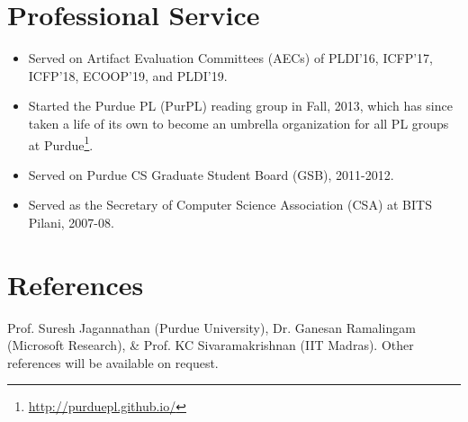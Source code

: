\documentclass[margin,line]{res}
\begin{document}
\begin{resume}
\section {Professional Service}
\begin{itemize}
  \item Served on Artifact Evaluation Committees (AECs) of PLDI'16,
    ICFP'17, ICFP'18, ECOOP'19, and PLDI'19.
  \item Started the Purdue PL (PurPL) reading group in Fall, 2013,
    which has since taken a life of its own to become an umbrella
    organization for all PL groups at Purdue\footnote{
    \url{http://purduepl.github.io/}}.
  \item Served on Purdue CS Graduate Student Board (GSB), 2011-2012.
  \item Served as the Secretary of Computer Science Association (CSA)
    at BITS Pilani, 2007-08. 
\end{itemize}

\section{References}
Prof. Suresh Jagannathan (Purdue University),
Dr. Ganesan Ramalingam (Microsoft Research), \&
Prof. KC Sivaramakrishnan (IIT Madras).
Other references will be available on request.
\end{resume} 
\end{document}
